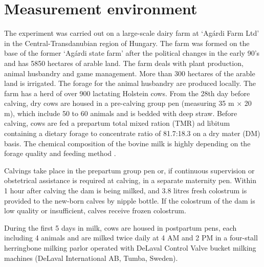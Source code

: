 \documentclass[conference]{IEEEtran}
\begin{document}

\section{Measurement environment}

The experiment was carried out on a large-scale dairy farm at ‘Agárdi Farm Ltd’ in the Central-Transdanubian region of Hungary. The farm was formed on the base of the former ‘Agárdi state farm’ after the political changes in the early 90’s and has 5850 hectares of arable land. The farm deals with plant production, animal husbandry and game management. More than 300 hectares of the arable land is irrigated. The forage for the animal husbandry are produced locally.
The farm has a herd of over 900 lactating Holstein cows. From the 28th day before calving, dry cows are housed in a pre-calving group pen (measuring 35 m × 20 m), which include 50 to 60 animals and is bedded with deep straw. Before calving, cows are fed a prepartum total mixed ration (TMR) ad libitum containing a dietary forage to concentrate ratio of 81.7:18.3 on a dry mater (DM) basis. The chemical composition of the bovine milk is highly depending on the forage quality and feeding method \cite{aidin2019}.

Calvings take place in the prepartum group pen or, if continuous supervision or obstetrical assistance is required at calving, in a separate maternity pen. Within 1 hour after calving the dam is being milked, and 3.8 litres fresh colostrum is provided to the new-born calves by nipple bottle. If the colostrum of the dam is low quality or insufficient, calves receive frozen colostrum.

During the first 5 days in milk, cows are housed in postpartum pens, each including 4 animals and are milked twice daily at 4 AM and 2 PM in a four-stall herringbone milking parlor operated with DeLaval Control Valve bucket milking machines (DeLaval International AB, Tumba, Sweden).
\end{document}
